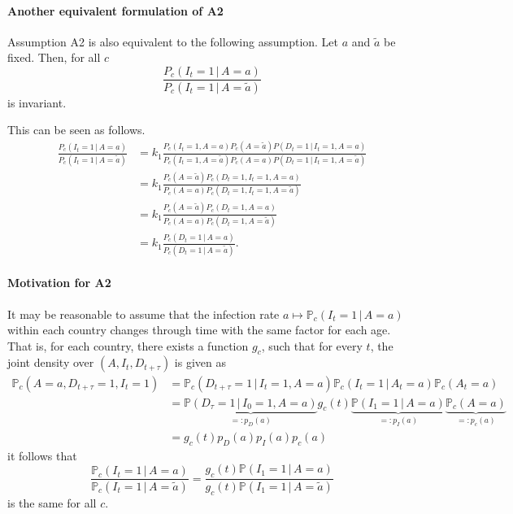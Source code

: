 \documentclass[a4paper]{article}
\renewcommand\P{\mathbb{P}}
\newcommand{\given}{\, \vert \,}
\begin{document}
\paragraph{Another equivalent formulation of A2}
Assumption A2 is also equivalent to the following assumption. 
Let $a$ and $\tilde{a}$ be fixed. Then, for all $c$
\begin{equation} \label{eq:equiv3}
\frac{P_c(I_t = 1\,|\,A = a)}{P_c(I_t = 1\,|\,A = \tilde{a})} 
\end{equation}
is invariant.

{\color{gray} This can be seen as follows.
\begin{align*}
\frac{P_c(I_t = 1\,|\,A = a)}{P_c(I_t = 1\,|\,A = \tilde{a})} 
&= k_1
\frac{P_c(I_t = 1,A = a)P_c(A = \tilde{a})
P(D_t = 1\,|\,I_t = 1, A = a)}
{P_c(I_t = 1,A = \tilde{a})P_c(A = a)P(D_t = 1\,|\,I_t = 1, A = \tilde{a})} \\
&= k_1
\frac{P_c(A = \tilde{a})
P_c(D_t = 1,I_t = 1, A = a)}
{P_c(A = a)P_c(D_t = 1,I_t = 1, A = \tilde{a})}\\
&= k_1
\frac{P_c(A = \tilde{a})
P_c(D_t = 1,A = a)}
{P_c(A = a)P_c(D_t = 1, A = \tilde{a})}\\
&= k_1
\frac{P_c(D_t = 1\,|\,A = a)}
{P_c(D_t = 1\,|\, A = \tilde{a})}.
\end{align*}
}



\paragraph{Motivation for A2}
It may be reasonable to assume that the infection rate $a \mapsto \P_c(I_{t} = 1 \given A = a)$ within 
each country changes through time with the same factor for each age. That is, for each country, there exists a function $g_c$, such that for every $t$, the joint
density over $(A,I_t,D_{t+\tau})$ is given as
%
\begin{align*}
\P_c(A = a, D_{t+\tau} = 1, I_t = 1)	&= \P_c(D_{t+\tau} = 1 \given I_t = 1, A = a)  \P_c(I_t = 1 \given A_t = a) \P_c(A_t = a) \\
															&= \underbrace{\P(D_{\tau} = 1 \given I_0 = 1, A = a)}_{=:p_D(a)} g_c(t) \underbrace{\P(I_1 = 1 \given A = a)}_{=:p_I(a)} \underbrace{\P_c(A = a)}_{=:p_c(a)} \\
															&=  g_c(t) p_D(a) p_I(a) p_c(a)
\end{align*}
%
it follows that 
$$
\frac{\P_c(I_t = 1 \given A = a)}{\P_c(I_t = 1 \given A = \tilde{a})} 
= 
\frac{
g_c(t) \P(I_1 = 1 \given A = a)}{
g_c(t) \P(I_1 = 1 \given A = \tilde{a})}
$$
is the same for all $c$. 
\end{document}
